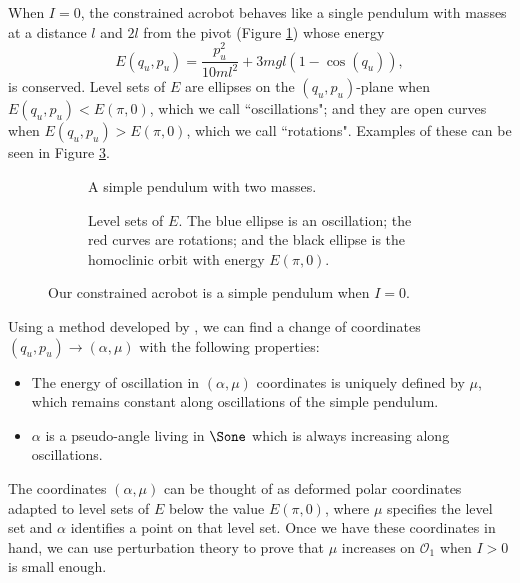 When \(I = 0\), the constrained acrobot behaves like a single
pendulum with masses at a distance \(l\) and \(2l\) from the pivot 
(Figure \ref{fig:acrobot-I0}) whose energy
\begin{equation}\label{eqn:acrobot-nominal-E}
    E(q_u,p_u) = \frac{p_u^2}{10ml^2} + 3mgl(1 - \cos(q_u))
    ,
\end{equation}
is conserved.
Level sets of \(E\) are ellipses on the \((q_u,p_u)\)-plane
when \(E(q_u,p_u) < E(\pi,0)\), which we call ``oscillations";
and they are open curves when \(E(q_u,p_u) > E(\pi,0)\), which we call
``rotations". 
Examples of these can be seen in Figure \ref{fig:pendulum-level-sets}.

\begin{figure}
    \centering
    \begin{subfigure}[t]{0.45\textwidth}
        
        \caption{A simple pendulum with two masses.}
        \label{fig:acrobot-I0}
    \end{subfigure}
    \hfill
    \begin{subfigure}[t]{0.5\textwidth}
        
        \caption{Level sets of \(E\).
            The blue ellipse is an oscillation; the red curves
            are rotations; and the black ellipse is the homoclinic
            orbit with energy \(E(\pi,0)\).}
        \label{fig:pendulum-level-sets}
    \end{subfigure}
    \caption{Our constrained acrobot is a simple pendulum when \(I = 0\).}
\end{figure}

Using a method developed by \citet{dynamic_vhcs_stabilize_closed_orbits},
we can find a change of coordinates \((q_u,p_u) \to (\alpha, \mu)\) with the
following properties:
\begin{itemize}
    \item The energy of oscillation in \((\alpha,\mu)\) coordinates is 
        uniquely defined by \(\mu\), which remains constant along oscillations
        of the simple pendulum.
    \item \(\alpha\) is a pseudo-angle living in \(\Sone\) which is
        always increasing along oscillations.
\end{itemize}
The coordinates \((\alpha,\mu)\) can be thought of as deformed polar coordinates
adapted to level sets of \(E\) below the value \(E(\pi,0)\), 
where \(\mu\) specifies the level set and \(\alpha\) identifies a point on that
level set.
Once we have these coordinates in hand, we can use perturbation theory to prove
that \(\mu\) increases on \(\mathcal{O}_1\) when \(I > 0\) is small enough.

